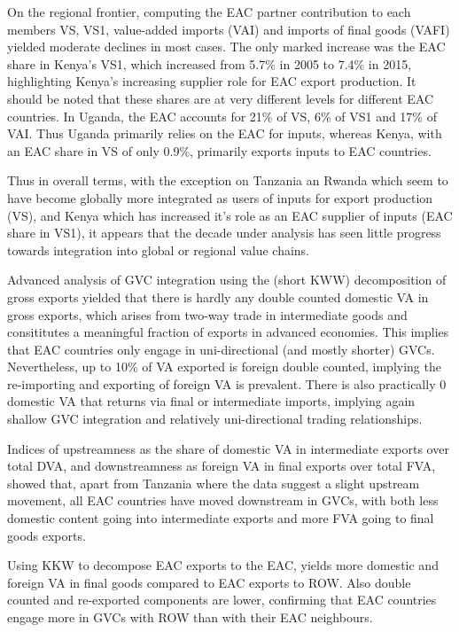 \documentclass[a4paper]{article}
\begin{document}
On the regional frontier, computing the EAC partner contribution to each members VS, VS1, value-added imports (VAI) and imports of final goods (VAFI) yielded moderate declines in most cases. The only marked increase was the EAC share in Kenya's VS1, which increased from 5.7\% in 2005 to 7.4\% in 2015, highlighting Kenya's increasing supplier role for EAC export production. It should be noted that these shares are at very different levels for different EAC countries. In Uganda, the EAC accounts for 21\% of VS, 6\% of VS1 and 17\% of VAI. Thus Uganda primarily relies on the EAC for inputs, whereas Kenya, with an EAC share in VS of only 0.9\%, primarily exports inputs to EAC countries. \newline

Thus in overall terms, with the exception on Tanzania an Rwanda which seem to have become globally more integrated as users of inputs for export production (VS), and Kenya which has increased it's role as an EAC supplier of inputs (EAC share in VS1), it appears that the decade under analysis has seen little progress towards integration into global or regional value chains.  \newline

Advanced analysis of GVC integration using the \citet{koopman2014tracing} (short KWW) decomposition of gross exports yielded that there is hardly any double counted domestic VA in gross exports, which arises from two-way trade in intermediate goods and consititutes a meaningful fraction of exports in advanced economies. This implies that EAC countries only engage in uni-directional (and mostly shorter) GVCs. Nevertheless, up to 10\% of VA exported is foreign double counted, implying the re-importing and exporting of foreign VA is prevalent. There is also practically 0 domestic VA that returns via final or intermediate imports, implying again shallow GVC integration and relatively uni-directional trading relationships. \newline
 
 Indices of upstreamness as the share of domestic VA in intermediate exports over total DVA, and downstreamness as foreign VA in final exports over total FVA, showed that, apart from Tanzania where the data suggest a slight upstream movement, all EAC countries have moved downstream in GVCs, with both less domestic content going into intermediate exports and more FVA going to final goods exports. \newline
 
 Using KKW to decompose EAC exports to the EAC, yields more domestic and foreign VA in final goods compared to EAC exports to ROW. Also double counted and re-exported components are lower, confirming that EAC countries engage more in GVCs with ROW than with their EAC neighbours. \newline
 
\end{document}
